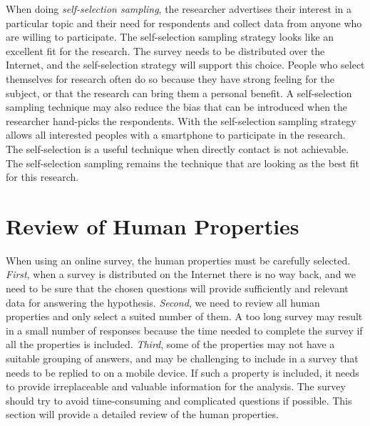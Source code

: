     When doing {\it self-selection sampling}, the researcher advertises their interest in a particular topic and their need for respondents and collect data from anyone who are willing to participate. The self-selection sampling strategy looks like an excellent fit for the research. The survey needs to be distributed over the Internet, and the self-selection strategy will support this choice. People who select themselves for research often do so because they have strong feeling for the subject, or that the research can bring them a personal benefit. A self-selection sampling technique may also reduce the bias that can be introduced when the researcher hand-picks the respondents. With the self-selection sampling strategy allows all interested peoples with a smartphone to participate in the research. The self-selection is a useful technique when directly contact is not achievable. The self-selection sampling remains the technique that are looking as the best fit for this research.

  \clearpage
  \section{Review of Human Properties}\label{sec:reviewofproperties} 

      When using an online survey, the human properties must be carefully selected. {\it First}, when a survey is distributed on the Internet there is no way back, and we need to be sure that the chosen questions will provide sufficiently and relevant data for answering the hypothesis. {\it Second}, we need to review all human properties and only select a suited number of them. A too long survey may result in a small number of responses because the time needed to complete the survey if all the properties is included. {\it Third}, some of the properties may not have a suitable grouping of answers, and may be challenging to include in a survey that needs to be replied to on a mobile device. If such a property is included, it needs to provide irreplaceable and valuable information for the analysis. The survey should try to avoid time-consuming and complicated questions if possible. This section will provide a detailed review of the human properties.

